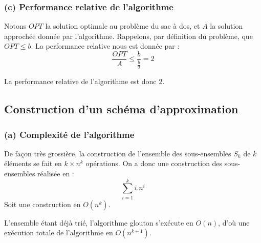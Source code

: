 \subsubsection{(c) Performance relative de l'algorithme}

Notons $OPT$ la solution optimale au problème du sac à dos, et $A$ la solution approchée donnée par
l'algorithme. Rappelons, par définition du problème, que $OPT \leq b $. La performance relative nous
est donnée par : $$
\frac{OPT}{A} \leq \frac{b}{\frac{b}{2}} = 2 $$

La performance relative de l'algorithme est donc 2.

\subsection{Construction d'un schéma d'approximation}

\subsubsection{(a) Complexité de l'algorithme}

De façon très grossière, la construction de l'ensemble des sous-ensembles $S_k$ de $k$ éléments se
fait en $k\times n^k$ opérations. On a donc une construction des sous-ensembles réalisée en : 
$$\sum_{i=1}^k i . n^i $$
Soit une construction en $O(n^k)$.

L'ensemble étant déjà trié, l'algorithme glouton s'exécute en $O(n)$, d'où une exécution totale de
l'algorithme en $O(n^{k+1})$.



